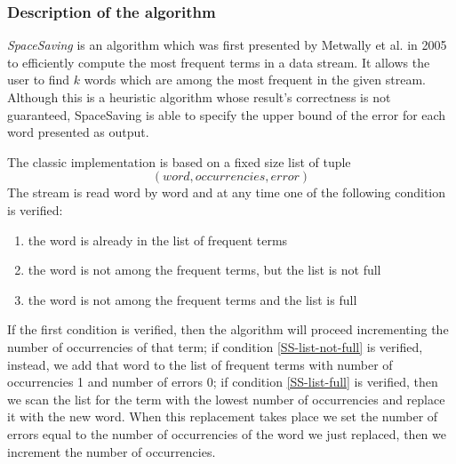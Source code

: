 \subsubsection*{Description of the algorithm}
\emph{SpaceSaving} \cite{SS} is an algorithm which was first presented by Metwally et al.
in 2005 to efficiently compute the most frequent terms in a data stream. It
allows the user to find $k$ words which are among the most frequent in the given
stream. Although this is a heuristic algorithm whose result's correctness is not
guaranteed, SpaceSaving is able to specify the upper bound of the error for each
word presented as output.

The classic implementation is based on a fixed size list of tuple 
\begin{displaymath}
	(word, occurrencies, error)
\end{displaymath}
The stream is read word by word and at any time one of the following condition
is verified:
\begin{enumerate}
	\item \label{SS-among-frequent}
		the word is already in the list of frequent terms
	\item \label{SS-list-not-full}
		the word is not among the frequent terms, but the list is not full
	\item \label{SS-list-full}
		the word is not among the frequent terms and the list is full
\end{enumerate}
If the first condition is verified, then the algorithm will proceed incrementing
the number of occurrencies of that term; if condition \ref{SS-list-not-full} is
verified, instead, we add that word to the list of frequent terms with number of
occurrencies 1 and number of errors 0; if condition \ref{SS-list-full} is
verified, then we scan the list for the term with the lowest number of
occurrencies and replace it with the new word. When this replacement takes place
we set the number of errors equal to the number of occurrencies of the word we
just replaced, then we increment the number of occurrencies.

